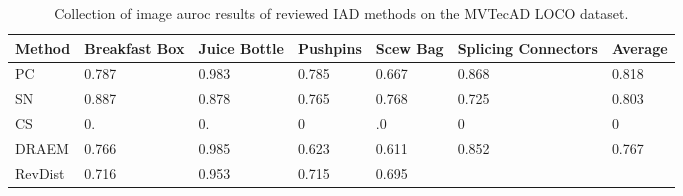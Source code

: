 \begin{table}[htbp]
    \tiny
    \centering
    \begin{tabularx}{\textwidth}{|X|X|X|X|X|X|X|}%
        \hline
        \textbf{Method} & \textbf{Breakfast Box} & \textbf{Juice Bottle} & \textbf{Pushpins} & \textbf{Scew Bag} & \textbf{Splicing Connectors} & \textbf{Average} \\
        \hline
        PC \cite{patchCore2022} & 0.787 & 0.983 & 0.785 & 0.667 & 0.868 & 0.818 \\
        \hline
        SN \cite{liu2023simplenet} & 0.887 & 0.878 & 0.765 & 0.768 & 0.725 & 0.803 \\
        \hline  %
        CS \cite{csflow2022} & 0. & 0. & 0 & .0 & 0 & 0 \\
        \hline
        DRAEM \cite{Zavrtanik_2021DRAEM} & 0.766 & 0.985 & 0.623 & 0.611 & 0.852 & 0.767 \\
        \hline
        RevDist \cite{revdist2023} & 0.716 & 0.953 & 0.715 & 0.695 &  &  \\
        \hline
    \end{tabularx}
    \caption{Collection of image auroc results of reviewed IAD methods on the MVTecAD LOCO \cite{LOCODentsAndScratchesBergmann2022} dataset.}
    \label{tab:imageaurocloco}
\end{table}





